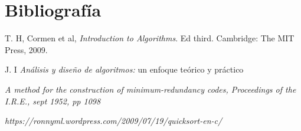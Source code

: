 \documentclass[12pt,twoside]{article}
\begin{document}
  \newpage

\section{Bibliograf\'ia}
\begin{thebibliography}{X}
	
	 \textsc{ T. H}, Cormen et al, \textit{Introduction to Algorithms}. Ed third. Cambridge: The MIT Press, 2009.
	
	 \textsc{J. I}\textit{ An\'alisis y dise\~no de algoritmos:} un enfoque te\'orico y pr\'actico
	
	
  \textit{A method for the construction of minimum-redundancy codes, Proceedings of the I.R.E., sept 1952, pp 1098}

 \textit{https://ronnyml.wordpress.com/2009/07/19/quicksort-en-c/}
\end{thebibliography}
\end{document}
